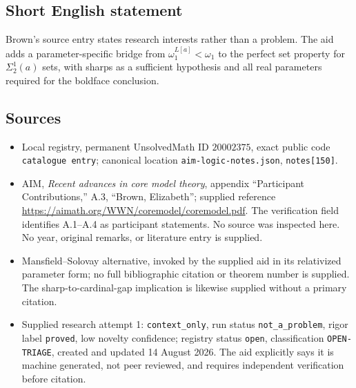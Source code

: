 \documentclass[11pt]{article}
\begin{document}
\subsection{Short English statement}
Brown's source entry states research interests rather than a problem. The aid adds a parameter-specific bridge from \(\omega_1^{L[a]}<\omega_1\) to the perfect set property for \(\Sigma^1_2(a)\) sets, with sharps as a sufficient hypothesis and all real parameters required for the boldface conclusion.
\subsection{Sources}
\begin{itemize}
\item Local registry, permanent UnsolvedMath ID \(20002375\), exact public code \texttt{catalogue entry}; canonical location \texttt{aim-logic-notes.json}, \texttt{notes[150]}.
\item AIM, \emph{Recent advances in core model theory}, appendix ``Participant Contributions,'' A.3, ``Brown, Elizabeth''; supplied reference \url{https://aimath.org/WWN/coremodel/coremodel.pdf}. The verification field identifies A.1--A.4 as participant statements. No source was inspected here. No year, original remarks, or literature entry is supplied.
\item Mansfield--Solovay alternative, invoked by the supplied aid in its relativized parameter form; no full bibliographic citation or theorem number is supplied. The sharp-to-cardinal-gap implication is likewise supplied without a primary citation.
\item Supplied research attempt 1: \texttt{context\_only}, run status \texttt{not\_a\_problem}, rigor label \texttt{proved}, low novelty confidence; registry status \texttt{open}, classification \texttt{OPEN-TRIAGE}, created and updated 14 August 2026. The aid explicitly says it is machine generated, not peer reviewed, and requires independent verification before citation.
\end{itemize}
\end{document}
